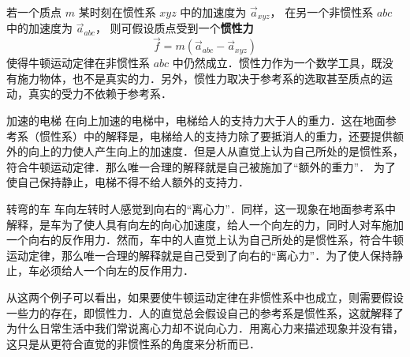 

若一个质点 $m$ 某时刻在惯性系 $xyz$ 中的加速度为 $\vec a_{xyz}$， 在另一个非惯性系 $abc$ 中的加速度为 $\vec a_{abc}$， 则可假设质点受到一个\textbf{惯性力}
\begin{equation}
\vec f = m( \vec a_{abc} - \vec a_{xyz} )
\end{equation}
使得牛顿运动定律在非惯性系 $abc$ 中仍然成立．惯性力作为一个数学工具，既没有施力物体，也不是真实的力．另外，惯性力取决于参考系的选取甚至质点的运动，真实的受力不依赖于参考系．

\begin{exam}{加速的电梯}\label{Iner_ex1}
在向上加速的电梯中，电梯给人的支持力大于人的重力．这在地面参考系（惯性系）中的解释是，电梯给人的支持力除了要抵消人的重力，还要提供额外的向上的力使人产生向上的加速度．但是人从直觉上认为自己所处的是惯性系，符合牛顿运动定律．那么唯一合理的解释就是自己被施加了“额外的重力”． 为了使自己保持静止，电梯不得不给人额外的支持力．
\end{exam}

\begin{exam}{转弯的车}
车向左转时人感觉到向右的“离心力”．同样，这一现象在地面参考系中解释，是车为了使人具有向左的向心加速度，给人一个向左的力，同时人对车施加一个向右的反作用力．然而，车中的人直觉上认为自己所处的是惯性系，符合牛顿运动定律，那么唯一合理的解释就是自己受到了向右的“离心力”．为了使人保持静止，车必须给人一个向左的反作用力．
\end{exam}

从这两个例子可以看出，如果要使牛顿运动定律在非惯性系中也成立，则需要假设一些力的存在，即惯性力．人的直觉总会假设自己的参考系是惯性系，这就解释了为什么日常生活中我们常说离心力却不说向心力．用离心力来描述现象并没有错，这只是从更符合直觉的非惯性系的角度来分析而已．

